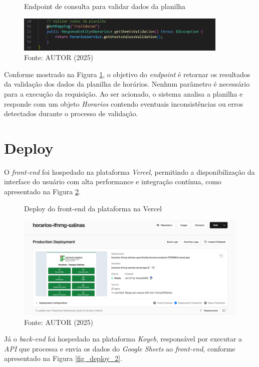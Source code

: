 \begin{itemize}
    \begin{figure}[htb]
        \centering
        \caption{Endpoint de consulta para validar dados da planilha}
        \includegraphics[width=0.9\textwidth]{Figuras/back-8.png}
        \caption*{Fonte: AUTOR (2025)}
        \label{fig_back_8}
    \end{figure}

    Conforme mostrado na Figura \ref{fig_back_8}, o objetivo do \textit{endpoint} é retornar os resultados da validação dos dados da planilha de horários. Nenhum parâmetro é necessário para a execução da requisição. Ao ser acionado, o sistema analisa a planilha e responde com um objeto \textit{Horarios} contendo eventuais inconsistências ou erros detectados durante o processo de validação.
\end{itemize}

\section{Deploy}

O \textit{front-end} foi hospedado na plataforma \textit{Vercel}, permitindo a disponibilização da interface do usuário com alta performance e integração contínua, como apresentado na Figura \ref{fig_deploy_1}.

\begin{figure}[H]
    \centering
    \caption{Deploy do front-end da plataforma na Vercel}
    \includegraphics[width=1\textwidth]{Figuras/deploy-1.png}
    \caption*{Fonte: AUTOR (2025)}
    \label{fig_deploy_1}
\end{figure}

Já o \textit{back-end} foi hospedado na plataforma \textit{Koyeb}, responsável por executar a \textit{API} que processa e envia os dados do \textit{Google Sheets} ao \textit{front-end}, conforme apresentado na Figura \ref{fig_deploy_2}.

